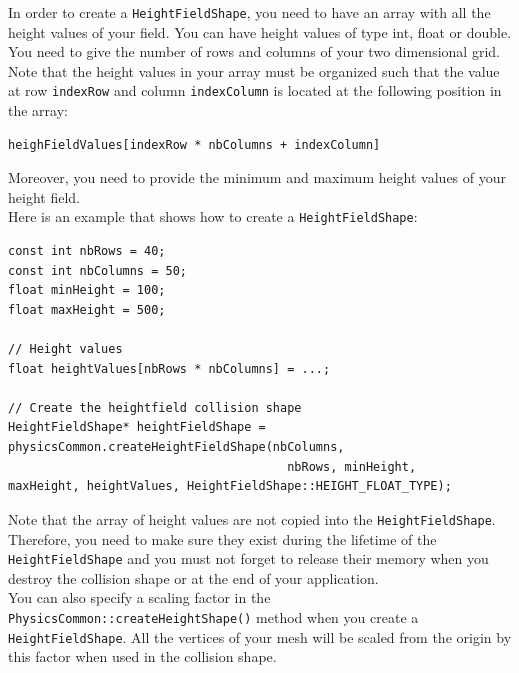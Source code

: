 \documentclass[a4paper,12pt]{article}
\begin{document}
  In order to create a \texttt{HeightFieldShape}, you need to have an array with all the height values of your field.
  You can have height values of type int, float or double. You need to give the number of rows and columns of your two
  dimensional grid. Note that the height values in your array must be organized such that the value at row
  \texttt{indexRow} and column \texttt{indexColumn} is located at the following position in the array: \\

  \begin{lstlisting}
heighFieldValues[indexRow * nbColumns + indexColumn]
  \end{lstlisting}

  \vspace{0.6cm}

  Moreover, you need to provide the minimum and maximum height values of your height field. \\

  Here is an example that shows how to create a \texttt{HeightFieldShape}: \\

  \begin{lstlisting}
const int nbRows = 40;
const int nbColumns = 50;
float minHeight = 100;
float maxHeight = 500;

// Height values
float heightValues[nbRows * nbColumns] = ...;

// Create the heightfield collision shape
HeightFieldShape* heightFieldShape = physicsCommon.createHeightFieldShape(nbColumns,
  							           nbRows, minHeight,
maxHeight, heightValues, HeightFieldShape::HEIGHT_FLOAT_TYPE);
  \end{lstlisting}

  \vspace{0.6cm}

  Note that the array of height values are not copied into the \texttt{HeightFieldShape}. Therefore, you need to make sure
  they exist during the lifetime of the \texttt{HeightField\allowbreak Shape} and you must not forget to release their memory when you
  destroy the collision shape or at the end of your application. \\

  You can also specify a scaling factor in the \texttt{PhysicsCommon::createHeightShape()} method  when you create a \texttt{Height\allowbreak FieldShape}.
  All the vertices of your mesh will be scaled from the origin by this factor when used in the collision shape. \\
\end{document}
